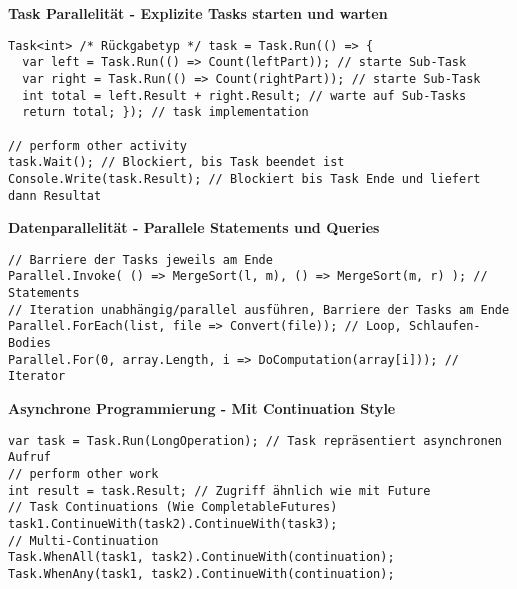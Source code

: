 \textbf{Task Parallelität - Explizite Tasks starten und warten}
\begin{lstlisting}
Task<int> /* Rückgabetyp */ task = Task.Run(() => {
  var left = Task.Run(() => Count(leftPart)); // starte Sub-Task
  var right = Task.Run(() => Count(rightPart)); // starte Sub-Task
  int total = left.Result + right.Result; // warte auf Sub-Tasks
  return total; }); // task implementation

// perform other activity
task.Wait(); // Blockiert, bis Task beendet ist
Console.Write(task.Result); // Blockiert bis Task Ende und liefert dann Resultat
\end{lstlisting}

\textbf{Datenparallelität - Parallele Statements und Queries }
\begin{lstlisting}
// Barriere der Tasks jeweils am Ende
Parallel.Invoke( () => MergeSort(l, m), () => MergeSort(m, r) ); // Statements
// Iteration unabhängig/parallel ausführen, Barriere der Tasks am Ende
Parallel.ForEach(list, file => Convert(file)); // Loop, Schlaufen-Bodies
Parallel.For(0, array.Length, i => DoComputation(array[i])); // Iterator
\end{lstlisting}



%
%

\textbf{Asynchrone Programmierung - Mit Continuation Style}

\begin{lstlisting}
var task = Task.Run(LongOperation); // Task repräsentiert asynchronen Aufruf
// perform other work
int result = task.Result; // Zugriff ähnlich wie mit Future
// Task Continuations (Wie CompletableFutures)
task1.ContinueWith(task2).ContinueWith(task3);
// Multi-Continuation
Task.WhenAll(task1, task2).ContinueWith(continuation);
Task.WhenAny(task1, task2).ContinueWith(continuation);
\end{lstlisting}
